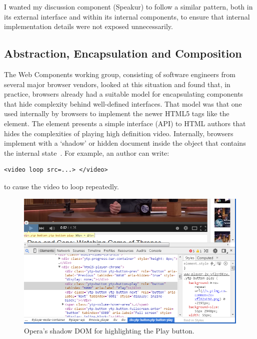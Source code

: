 I wanted my discussion component (Speakur) to follow a similar pattern, 
both in its external interface and within its internal components, 
to ensure that internal implementation details were not exposed unnecessarily.

\subsection{Abstraction, Encapsulation and Composition}

The Web Components working group, consisting of software engineers from several major browser vendors, 
looked at this situation and found that, in practice, browsers already had a suitable model for encapsulating components that hide complexity behind well-defined interfaces.
That model was that one used internally by browsers to implement the newer 
HTML5 tags 
like the \textbf{} element. 
The  element presents a simple interface (API) to HTML authors that hides the complexities of playing high definition video.
Internally, browsers implement  with a `shadow' or hidden document inside the object that contains the internal state~\cite{kitamura2014}. 
For example, an author can write:
\begin{lstlisting}[language=HTML5,numbers=none]
	<video loop src=...> </video>
\end{lstlisting}
to cause the video to loop repeatedly.

\begin{figure}[htb]
\centerline{\includegraphics[width=6in]{images/html5_video_control.png}} 
\caption{Opera's shadow DOM for  highlighting the Play button.}
\label{f:html5video}
\end{figure}

